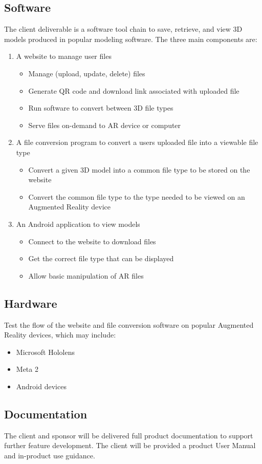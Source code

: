 \subsection{Software}
The client deliverable is a software tool chain to save, retrieve, and view 3D models produced in popular modeling software. The three main components are:

\begin{enumerate}
	\item A website to manage user files
		\begin{itemize}
			\item Manage (upload, update, delete) files
			\item Generate QR code and download link associated with uploaded file
			\item Run software to convert between 3D file types
			\item Serve files on-demand to AR device or computer 
		\end{itemize}
	\item A file conversion program to convert a users uploaded file into a viewable file type
		\begin{itemize}
			\item Convert a given 3D model into a common file type to be stored on the website
			\item Convert the common file type to the type needed to be viewed on an Augmented Reality device
		\end{itemize}
	\item An Android application to view models
		\begin{itemize}
			\item Connect to the website to download files
			\item Get the correct file type that can be displayed
			\item Allow basic manipulation of AR files
		\end{itemize}
\end{enumerate}

\subsection{Hardware}

Test the flow of the website and file conversion software on popular Augmented Reality devices, which may include:
\begin{itemize}
	\item Microsoft Hololens
	\item Meta 2
	\item Android devices
\end{itemize}

\subsection{Documentation}

The client and sponsor will be delivered full product documentation to support further feature development. The client will be provided a product User Manual and in-product use guidance. 
